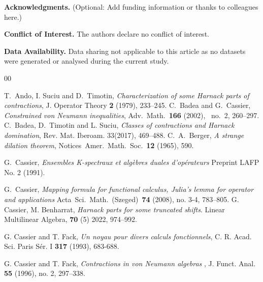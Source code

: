 \documentclass[12pt, reqno]{amsart}
\theoremstyle{definition}
\theoremstyle{remark}
\numberwithin{equation}{section}
\begin{document}
\medskip

\noindent\textbf{Acknowledgments.} (Optional: Add funding information or thanks to colleagues here.)

\medskip

\noindent\textbf{Conflict of Interest.} The authors declare no conflict of interest.

\medskip

\noindent\textbf{Data Availability.} Data sharing not applicable to this article as no datasets were generated or analysed during the current study.


\begin{thebibliography}{00}

 T.~Ando, I. Suciu and D.~Timotin, 
\textit{ Characterization of some Harnack parts of contractions}, 
J. Operator Theory \textbf{2} (1979), 233--245.
%
 C.~Badea  and G.~Cassier, 
\textit{ Constrained von Neumann inequalities},  
Adv.\ Math.\ \textbf{166} (2002), \ no.~2, 260--297.
%
 C.~Badea, D.~Timotin  and L. Suciu, 
\textit{ Classes of contractions and Harnack domination}, Rev. Mat. Iberoam. 33(2017), 469--488.
%
 C.~A.~Berger, 
\textit{ A strange dilation theorem}, 
Notices\ Amer.\ Math.\ Soc.\  \textbf{12} (1965), 590.

%
 G.~Cassier,
\textit{ Ensembles K-spectraux et algèbres duales d'opérateurs}
Preprint LAFP No. 2 (1991).

%
 G.~Cassier,
\textit{Mapping formula for functional calculus, Julia's lemma for operator and applications}
Acta\ Sci.\ Math.\ (Szeged)\  \textbf{74} (2008), no. 3-4, 783--805.
%
	G. Cassier, M. Benharrat,
{\textit{Harnack parts for some truncated shifts}}. Linear Multilinear Algebra, \textbf{70} (5) 2022, 974--992.  
%


%
G. Cassier and T. Fack, 
\textit{Un noyau pour divers calculs fonctionnels},
C. R. Acad. Sci. Paris S\'er. I \textbf{317} (1993), 683-688.   

%
G. Cassier and T. Fack, 
\textit{Contractions in von Neumann algebras },   
J. Funct. Anal. \textbf{55} (1996), no. 2, 297--338.  


\end{thebibliography}
\end{document}
